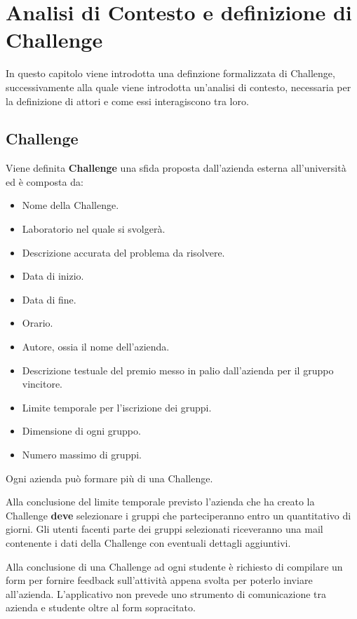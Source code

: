 \chapter{Analisi di Contesto e definizione di Challenge}

In questo capitolo viene introdotta una definzione formalizzata di Challenge, successivamente alla quale viene introdotta un'analisi di contesto, necessaria per la definizione di attori e come essi interagiscono tra loro.

\section{Challenge}
Viene definita \textbf{Challenge} una sfida proposta dall'azienda esterna all'università ed è composta da:
\begin{itemize}
    \item Nome della Challenge.
    \item Laboratorio nel quale si svolgerà.
    \item Descrizione accurata del problema da risolvere.
    \item Data di inizio. 
    \item Data di fine.
    \item Orario.
    \item Autore, ossia il nome dell'azienda.
    \item Descrizione testuale del premio messo in palio dall'azienda per il gruppo vincitore.
    \item Limite temporale per l'iscrizione dei gruppi.
    \item Dimensione di ogni gruppo. 
    \item Numero massimo di gruppi.
\end{itemize}

Ogni azienda può formare più di una Challenge.

Alla conclusione del limite temporale previsto l'azienda che ha creato la Challenge \textbf{deve} selezionare i gruppi che parteciperanno entro un quantitativo di giorni. Gli utenti facenti parte dei gruppi selezionati riceveranno una mail contenente i dati della Challenge con eventuali dettagli aggiuntivi.

Alla conclusione di una Challenge ad ogni studente è richiesto di compilare un form per fornire feedback sull'attività appena svolta per poterlo inviare all'azienda.
L'applicativo non prevede uno strumento di comunicazione tra azienda e studente oltre al form sopracitato.


